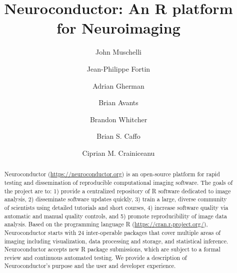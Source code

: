 \documentclass[]{elsarticle} %
\begin{document}
\begin{frontmatter}

  \title{Neuroconductor: An R platform for Neuroimaging}
    \author[JHU]{John Muschelli}
    \author[Penn]{Jean-Philippe Fortin}
  
    \author[JHU]{Adrian Gherman}
   \author[Biogen]{Brian Avants}
   
   \author[Klarismo,Imperial]{Brandon Whitcher}
   
    \author[JHU]{Brian S. Caffo}
  
    \author[JHU]{Ciprian M. Crainiceanu}
  
      \address[JHU]{Johns Hopkins Bloomberg School of Public Health, Department of
Biostatistics, 615 N Wolfe St, Baltimore, MD, 21205}
    \address[Penn]{Perelman School of Medicine, University of Pennsylvania, Department of
Biostatistics and Epidemiology, 423 Guardian Drive, Philadelphia, PA
19104}
      \address[Biogen]{Biogen, Cambridge, MA 02142}
      \address[Klarismo]{Klarismo Ltd, London, UK}
      \address[Imperial]{Department of Mathematics, Imperial College London, London, UK}
  
  \begin{abstract}
Neuroconductor (\url{https://neuroconductor.org}) is an open-source platform for rapid testing and dissemination of reproducible computational imaging software. The goals of the project are to: 1) provide a centralized repository of R software dedicated to image analysis, 2) disseminate  software updates quickly, 3) train a large, diverse community of scientists using detailed tutorials and short courses, 4) increase software quality via automatic and manual quality controls, and 5) promote reproducibility of image data analysis. Based on the  programming language R (\url{https://cran.r-project.org/}), Neuroconductor starts with 24 inter-operable packages that cover multiple areas of imaging including visualization, data processing and storage, and statistical inference. Neuroconductor accepts new R package submissions, which are subject to a formal review and continuous automated testing. We provide a description of Neuroconductor's purpose and the user and developer experience.  
\end{abstract}
 
 \end{frontmatter}
\end{document}
